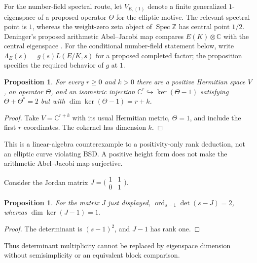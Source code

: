 \documentclass[11pt]{amsart}
\theoremstyle{plain}
\newtheorem{proposition}[theorem]{Proposition}
\theoremstyle{definition}
\theoremstyle{remark}
\numberwithin{equation}{section}
\newcommand{\C}{\mathbb{C}}
\newcommand{\Z}{\mathbb{Z}}
\DeclareMathOperator{\Spec}{Spec}
\DeclareMathOperator{\ord}{ord}
\begin{document}
For the number-field spectral route, let $V_{E,(1)}$ denote a finite
generalized $1$-eigenspace of a proposed operator $\Theta$ for the
elliptic motive. The relevant spectral point is $1$, whereas the
weight-zero zeta object of $\Spec\Z$ has central point $1/2$.
Deninger's proposed arithmetic Abel--Jacobi map compares
$E(K)\otimes\C$ with the central eigenspace
\cite[p.~8 and Example~5, p.~10]{Deninger2010HilbertPolya}.
For the conditional number-field statement below, write
$\Lambda_E(s)=g(s)L(E/K,s)$ for a proposed completed factor;
the proposition specifies the required behavior of $g$ at $1$.

\begin{proposition}\label{prop:bsd-positive-gap}
For every $r\geq0$ and $k>0$ there are a positive Hermitian space
$V$, an operator $\Theta$, and an isometric injection
$\C^r\hookrightarrow\ker(\Theta-1)$ satisfying
$\Theta+\Theta^*=2$ but with
$\dim\ker(\Theta-1)=r+k$.
\end{proposition}
\begin{proof}
Take $V=\C^{r+k}$ with its usual Hermitian metric,
$\Theta=1$, and include the first $r$ coordinates. The cokernel
has dimension $k$.
\end{proof}

This is a linear-algebra counterexample to a positivity-only rank
deduction, not an elliptic curve violating BSD. A positive height form
does not make the arithmetic Abel--Jacobi map surjective.

Consider the Jordan matrix
$J=\bigl(\begin{smallmatrix}1&1\\0&1\end{smallmatrix}\bigr)$.

\begin{proposition}\label{prop:bsd-jordan-gap}
For the matrix $J$ just displayed,
$\ord_{s=1}\det(s-J)=2$, whereas $\dim\ker(J-1)=1$.
\end{proposition}
\begin{proof}
The determinant is $(s-1)^2$, and $J-1$ has rank one.
\end{proof}

Thus determinant multiplicity cannot be replaced by eigenspace
dimension without semisimplicity or an equivalent block comparison.
\end{document}
